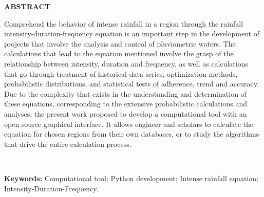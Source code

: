 \thispagestyle{empty}

\singlespacing
\begin{center}
	\textbf{ABSTRACT}
\end{center}

\noindent Comprehend the behavior of intense rainfall in a region through the rainfall intensity-duration-frequency equation is an important step in the development of projects that involve the analysis and control of pluviometric waters. The calculations that lead to the equation mentioned involve the grasp of the relationship between intensity, duration and frequency, as well as calculations that go through treatment of historical data series, optimization methods, probabilistic distributions, and statistical tests of adherence, trend and accuracy. Due to the complexity that exists in the understanding and determination of these equations, corresponding to the extensive probabilistic calculations and analyses, the present work proposed to develop a computational tool with an open source graphical interface. It allows engineer and scholars to calculate the equation for chosen regions from their own databases, or to study the algorithms that drive the entire calculation process.

\ \

\noindent \textbf{Keywords:} Computational tool; Python development; Intense rainfall equation; Intensity-Duration-Frequency.
\newpage
